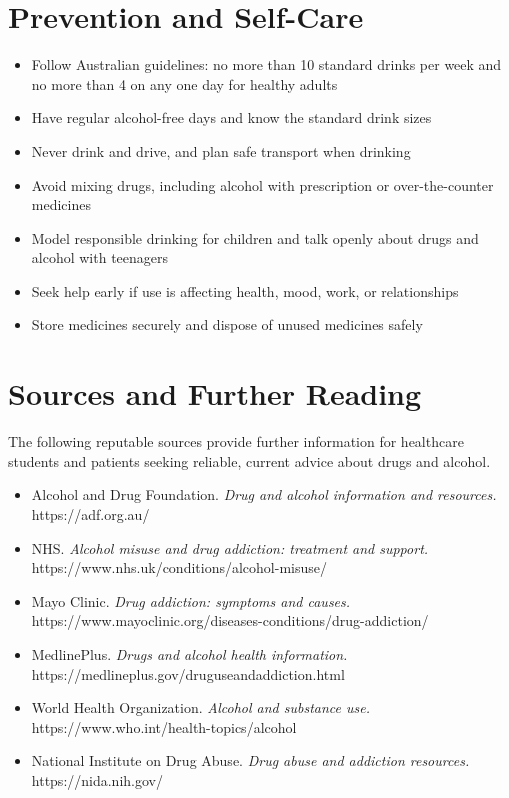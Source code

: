 \section*{Prevention and Self-Care}
\begin{itemize}
    \item Follow Australian guidelines: no more than 10 standard drinks per week and no more than 4 on any one day for healthy adults
    \item Have regular alcohol-free days and know the standard drink sizes
    \item Never drink and drive, and plan safe transport when drinking
    \item Avoid mixing drugs, including alcohol with prescription or over-the-counter medicines
    \item Model responsible drinking for children and talk openly about drugs and alcohol with teenagers
    \item Seek help early if use is affecting health, mood, work, or relationships
    \item Store medicines securely and dispose of unused medicines safely
\end{itemize}

\section*{Sources and Further Reading}
The following reputable sources provide further information for healthcare students and patients seeking reliable, current advice about drugs and alcohol.
\begin{itemize}
    \item Alcohol and Drug Foundation. \textit{Drug and alcohol information and resources.} https://adf.org.au/
    \item NHS. \textit{Alcohol misuse and drug addiction: treatment and support.} https://www.nhs.uk/conditions/alcohol-misuse/
    \item Mayo Clinic. \textit{Drug addiction: symptoms and causes.} https://www.mayoclinic.org/diseases-conditions/drug-addiction/
    \item MedlinePlus. \textit{Drugs and alcohol health information.} https://medlineplus.gov/druguseandaddiction.html
    \item World Health Organization. \textit{Alcohol and substance use.} https://www.who.int/health-topics/alcohol
    \item National Institute on Drug Abuse. \textit{Drug abuse and addiction resources.} https://nida.nih.gov/
\end{itemize}
